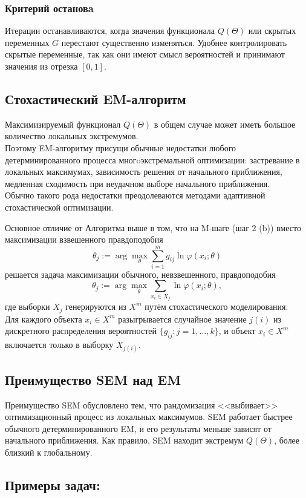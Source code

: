 \subsubsection*{Критерий остановa}
Итерации останавливаются, когда значения функционала $Q(\Theta)$ или скрытых переменных $G$ перестают существенно изменяться. Удобнее контролировать скрытые переменные, так как они имеют смысл вероятностей и принимают значения из отрезка $[0, 1]$.
\newpage
\subsection*{Стохастический EM-алгоритм}
Максимизируемый функционал $Q(\Theta)$ в общем случае может иметь большое количество локальных экстремумов. \\
Поэтому EM-алгоритму присущи обычные недостатки любого детерминированного процесса многoэкстремальной оптимизации: застревание в локальных максимумах, зависимость решения от начального приближения, медленная сходимость при неудачном выборе начального приближения.\\ Обычно такого рода недостатки преодолеваются методами адаптивной стохастической оптимизации.

Основное отличие от Алгоритма выше в том, что на M-шаге (шаг 2 (b)) вместо максимизации взвешенного правдоподобия
\[
    \theta_j := \arg \max_{\theta} \sum_{i=1}^m g_{ij} \ln \varphi(x_i; \theta)
\]
решается задача максимизации обычного, невзвешенного, правдоподобия
\[
    \theta_j := \arg \max_{\theta} \sum_{x_i \in X_j} \ln \varphi(x_i; \theta),
\]
где выборки $X_j$ генерируются из $X^m$ путём стохастического моделирования.\\
Для каждого объекта $x_i \in X^m$ разыгрывается случайное значение $j(i)$ из дискретного распределения вероятностей $\{g_{ij} : j = 1, \dots, k\}$,  и объект  $x_i \in X^m$ включается
только в выборку $X_{j(i)}$.

\subsection*{Преимущество SEM над EM}
Преимущество SEM обусловлено тем, что рандомизация <<выбивает>> оптимизационный процесс из локальных максимумов. SEM работает быстрее обычного детерминированного EM, и его результаты меньше зависят от начального приближения. Как правило, SEM находит экстремум $Q(\Theta)$, более близкий к глобальному.

\newpage

\subsection*{Примеры задач: }

